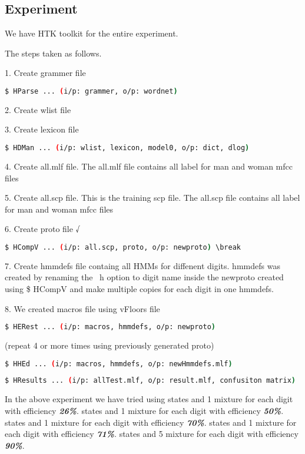 \subsection{Experiment}
\begin{flushleft}
  We have HTK toolkit for the entire experiment.
  
  The steps taken as follows. \break
  
  1. Create grammer file \break
  \begin{lstlisting}[language=bash]
    $ HParse ... (i/p: grammer, o/p: wordnet)
  \end{lstlisting}
  2. Create {wlist} file \break
  
  3. Create {lexicon} file \break
  \begin{lstlisting}[language=bash]
    $ HDMan ... (i/p: wlist, lexicon, model0, o/p: dict, dlog)
 \end{lstlisting}
  4. Create {all.mlf} file. The all.mlf file contains all label for man and woman mfcc files \break
  
  5. Create {all.scp} file. This is the training scp file. The all.scp file contains all label for man and woman mfcc files \break
  
  6. Create {proto} file √ \break
  \begin{lstlisting}[language=bash]
    $ HCompV ... (i/p: all.scp, proto, o/p: newproto) \break 
  \end{lstlisting}
  
  7. Create {hmmdefs} file containg all HMMs for diffenent digits. hmmdefs was created by renaming the ~h option to digit name 
    inside the newproto created using \$ HCompV and make multiple copies for each digit in one hmmdefs.
    
  8. We created {macros} file using {vFloors} file
  
  \begin{lstlisting}[language=bash]
    $ HERest ... (i/p: macros, hmmdefs, o/p: newproto)
    \end{lstlisting}
    (repeat 4 or more times using previously generated proto)
    \break
    
    \begin{lstlisting}[language=bash]
    $ HHEd ... (i/p: macros, hmmdefs, o/p: newHmmdefs.mlf)
    \end{lstlisting}

    
    \begin{lstlisting}[language=bash]
    $ HResults ... (i/p: allTest.mlf, o/p: result.mlf, confusiton matrix)
    \end{lstlisting}
    
  In the above experiment we have tried using  states and 1 mixture for each digit with efficiency \textbf{\textit{26\%}}.  states and 1 mixture for each digit with efficiency \textbf{\textit{50\%}}.  states and 1 mixture for each digit with efficiency \textbf{\textit{70\%}}.  states and 1 mixture for each digit with efficiency \textbf{\textit{71\%}}.  states and 5 mixture for each digit with efficiency \textbf{\textit{90\%}}. \break
\end{flushleft}

